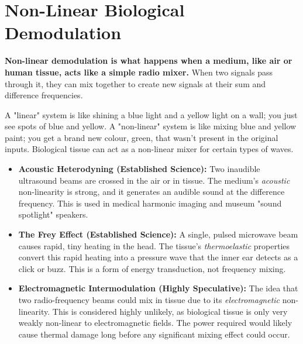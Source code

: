 
\chapter{Non-Linear Biological Demodulation}
\label{ch:nonlinear-bio-demod}

\begin{nontechnical}
    \textbf{Non-linear demodulation is what happens when a medium, like air or human tissue, acts like a simple radio mixer.} When two signals pass through it, they can mix together to create new signals at their sum and difference frequencies.

    A "linear" system is like shining a blue light and a yellow light on a wall; you just see spots of blue and yellow. A "non-linear" system is like mixing blue and yellow paint; you get a brand new colour, green, that wasn't present in the original inputs. Biological tissue can act as a non-linear mixer for certain types of waves.

    \begin{itemize}
        \item \textbf{Acoustic Heterodyning (Established Science):} Two inaudible ultrasound beams are crossed in the air or in tissue. The medium's \emph{acoustic} non-linearity is strong, and it generates an audible sound at the difference frequency. This is used in medical harmonic imaging and museum "sound spotlight" speakers.
        \item \textbf{The Frey Effect (Established Science):} A single, pulsed microwave beam causes rapid, tiny heating in the head. The tissue's \emph{thermoelastic} properties convert this rapid heating into a pressure wave that the inner ear detects as a click or buzz. This is a form of energy transduction, not frequency mixing.
        \item \textbf{Electromagnetic Intermodulation (Highly Speculative):} The idea that two radio-frequency beams could mix in tissue due to its \emph{electromagnetic} non-linearity. This is considered highly unlikely, as biological tissue is only very weakly non-linear to electromagnetic fields. The power required would likely cause thermal damage long before any significant mixing effect could occur.
    \end{itemize}
\end{nontechnical}


